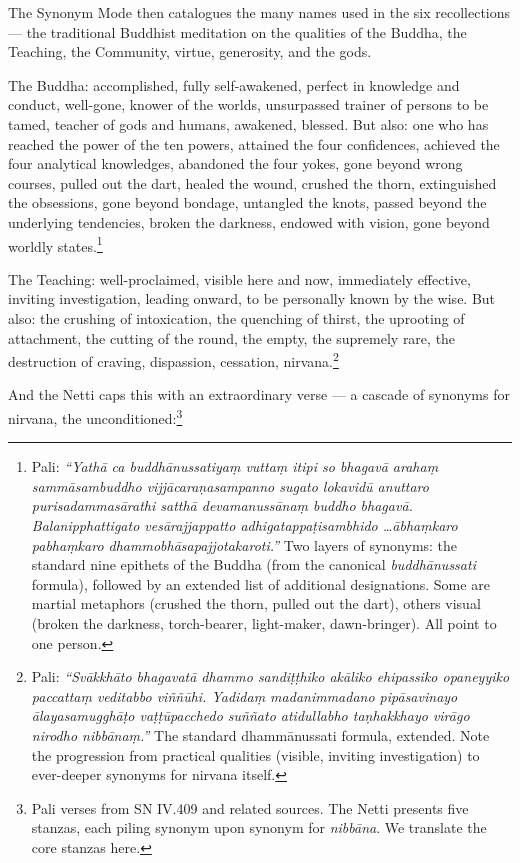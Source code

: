 The Synonym Mode then catalogues the many names used in the six recollections --- the traditional Buddhist meditation on the qualities of the Buddha, the Teaching, the Community, virtue, generosity, and the gods.

The Buddha: accomplished, fully self-awakened, perfect in knowledge and conduct, well-gone, knower of the worlds, unsurpassed trainer of persons to be tamed, teacher of gods and humans, awakened, blessed. But also: one who has reached the power of the ten powers, attained the four confidences, achieved the four analytical knowledges, abandoned the four yokes, gone beyond wrong courses, pulled out the dart, healed the wound, crushed the thorn, extinguished the obsessions, gone beyond bondage, untangled the knots, passed beyond the underlying tendencies, broken the darkness, endowed with vision, gone beyond worldly states.\footnote{Pali: \textit{``Yathā ca buddhānussatiyaṃ vuttaṃ itipi so bhagavā arahaṃ sammāsambuddho vijjācaraṇasampanno sugato lokavidū anuttaro purisadammasārathi satthā devamanussānaṃ buddho bhagavā. Balanipphattigato vesārajjappatto adhigatappaṭisambhido \ldots ābhaṃkaro pabhaṃkaro dhammobhāsapajjotakaroti.''} Two layers of synonyms: the standard nine epithets of the Buddha (from the canonical \textit{buddhānussati} formula), followed by an extended list of additional designations. Some are martial metaphors (crushed the thorn, pulled out the dart), others visual (broken the darkness, torch-bearer, light-maker, dawn-bringer). All point to one person.}

The Teaching: well-proclaimed, visible here and now, immediately effective, inviting investigation, leading onward, to be personally known by the wise. But also: the crushing of intoxication, the quenching of thirst, the uprooting of attachment, the cutting of the round, the empty, the supremely rare, the destruction of craving, dispassion, cessation, nirvana.\footnote{Pali: \textit{``Svākkhāto bhagavatā dhammo sandiṭṭhiko akāliko ehipassiko opaneyyiko paccattaṃ veditabbo viññūhi. Yadidaṃ madanimmadano pipāsavinayo ālayasamugghāṭo vaṭṭūpacchedo suññato atidullabho taṇhakkhayo virāgo nirodho nibbānaṃ.''} The standard dhammānussati formula, extended. Note the progression from practical qualities (visible, inviting investigation) to ever-deeper synonyms for nirvana itself.}

And the Netti caps this with an extraordinary verse --- a cascade of synonyms for nirvana, the unconditioned:\footnote{Pali verses from SN IV.409 and related sources. The Netti presents five stanzas, each piling synonym upon synonym for \textit{nibbāna}. We translate the core stanzas here.}

